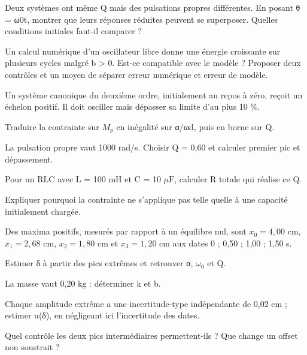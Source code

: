 \begin{questions}
\item Deux systèmes ont même Q mais des pulsations propres différentes. En posant θ = ω0t, montrer que leurs réponses réduites peuvent se superposer. Quelles conditions initiales faut-il comparer ?
\end{questions}

\begin{questions}
\item Un calcul numérique d’un oscillateur libre donne une énergie croissante sur plusieurs cycles malgré b > 0. Est-ce compatible avec le modèle ? Proposer deux contrôles et un moyen de séparer erreur numérique et erreur de modèle.
\end{questions}



\label{ch05-ex-D1}
Un système canonique du deuxième ordre, initialement au repos à zéro, reçoit un échelon positif. Il doit osciller mais dépasser sa limite d’au plus 10 \%.\begin{questions}
\item Traduire la contrainte sur $M_p$ en inégalité sur α/ωd, puis en borne sur Q.
\item La pulsation propre vaut 1000 rad/s. Choisir Q = 0,60 et calculer premier pic et dépassement.
\item Pour un RLC avec L = 100 mH et C = 10 $\mu\mathrm{ F}$, calculer R totale qui réalise ce Q.
\item Expliquer pourquoi la contrainte ne s’applique pas telle quelle à une capacité initialement chargée.
\end{questions}


\label{ch05-ex-D2}
Des maxima positifs, mesurés par rapport à un équilibre nul, sont $x_0=4{,}00$ cm, $x_1=2{,}68$ cm, $x_2=1{,}80$ cm et $x_3=1{,}20$ cm aux dates 0 ; 0,50 ; 1,00 ; 1,50 s.\begin{questions}
\item Estimer δ à partir des pics extrêmes et retrouver α, $\omega_0$ et Q.
\item La masse vaut 0,20 kg : déterminer k et b.
\item Chaque amplitude extrême a une incertitude-type indépendante de 0,02 cm ; estimer u(δ), en négligeant ici l’incertitude des dates.
\item Quel contrôle les deux pics intermédiaires permettent-ils ? Que change un offset non soustrait ?
\end{questions}


